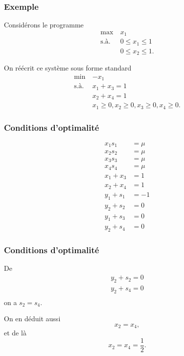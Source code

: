 \documentclass[usepdftitle=false, aspectratio=169]{beamer}
\begin{document}
\begin{frame}
\frametitle{Exemple}

Considérons le programme
\begin{align*}
\max\ & x_1 \\
\mbox{s.à. } & 0 \leq x_1 \leq 1 \\
& 0 \leq x_2 \leq 1.
\end{align*}

\mbox{}

On réécrit ce système sous forme standard
\begin{align*}
\min\ & -x_1 \\
\mbox{s.à. } & x_1 + x_3 = 1\\
& x_2 + x_4 = 1 \\
& x_1 \geq 0, x_2 \geq 0, x_3 \geq 0, x_4 \geq 0.
\end{align*}

\end{frame}

\begin{frame}
\frametitle{Conditions d'optimalité}

\begin{align*}
x_1 s_1 &= \mu \\
x_2 s_2 &= \mu \\
x_3 s_3 &= \mu \\
x_4 s_4 &= \mu \\
x_1 + x_3 &= 1 \\
x_2 + x_4 &= 1 \\
y_1 + s_1 &= -1 \\
y_2 + s_2 &= 0 \\
y_1 + s_3 &= 0 \\
y_2 + s_4 &= 0
\end{align*}

\end{frame}

\begin{frame}
\frametitle{Conditions d'optimalité}

De
\begin{align*}
y_2 + s_2 = 0 \\
y_2 + s_4 = 0 \\
\end{align*}
on a $s_2 = s_4$.

\mbox{}

On en déduit aussi
\[
x_2 = x_4,
\]
et de là
\[
x_2 = x_4 = \frac{1}{2}.
\]

\end{frame}
\end{document}
